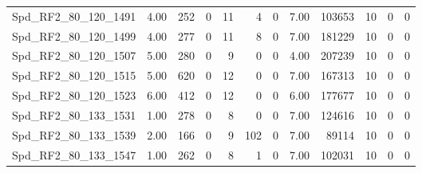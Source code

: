 \begin{longtable}[c]{@{}lrrrrrrrrrrr@{}}
Spd\_RF2\_80\_120\_1491      & 4.00                   & 252                     & 0                       & 11                     & 4                       & 0                       & 7.00                    & 103653                   & 10                       & 0                        & 0                        \\
Spd\_RF2\_80\_120\_1499      & 4.00                   & 277                     & 0                       & 11                     & 8                       & 0                       & 7.00                    & 181229                   & 10                       & 0                        & 0                        \\
Spd\_RF2\_80\_120\_1507      & 5.00                   & 280                     & 0                       & 9                      & 0                       & 0                       & 4.00                    & 207239                   & 10                       & 0                        & 0                        \\
Spd\_RF2\_80\_120\_1515      & 5.00                   & 620                     & 0                       & 12                     & 0                       & 0                       & 7.00                    & 167313                   & 10                       & 0                        & 0                        \\
Spd\_RF2\_80\_120\_1523      & 6.00                   & 412                     & 0                       & 12                     & 0                       & 0                       & 6.00                    & 177677                   & 10                       & 0                        & 0                        \\
Spd\_RF2\_80\_133\_1531      & 1.00                   & 278                     & 0                       & 8                      & 0                       & 0                       & 7.00                    & 124616                   & 10                       & 0                        & 0                        \\
Spd\_RF2\_80\_133\_1539      & 2.00                   & 166                     & 0                       & 9                      & 102                     & 0                       & 7.00                    & 89114                    & 10                       & 0                        & 0                        \\
Spd\_RF2\_80\_133\_1547      & 1.00                   & 262                     & 0                       & 8                      & 1                       & 0                       & 7.00                    & 102031                   & 10                       & 0                        & 0                        \\

\end{longtable}
